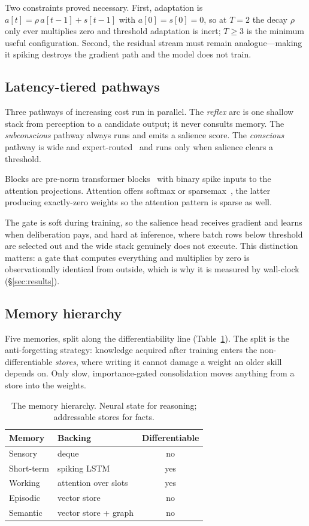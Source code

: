 \documentclass[10pt,twocolumn]{article}
\begin{document}
Two constraints proved necessary. First, adaptation is
$a[t] = \rho\,a[t{-}1] + s[t{-}1]$ with $a[0]=s[0]=0$, so at $T=2$ the decay
$\rho$ only ever multiplies zero and threshold adaptation is inert; $T\geq3$ is
the minimum useful configuration. Second, the residual stream must remain
analogue---making it spiking destroys the gradient path and the model does not
train.

\subsection{Latency-tiered pathways}

Three pathways of increasing cost run in parallel. The \emph{reflex} arc is one
shallow stack from perception to a candidate output; it never consults memory.
The \emph{subconscious} pathway always runs and emits a salience score. The
\emph{conscious} pathway is wide and expert-routed~\cite{shazeer2017,fedus2022}
and runs only when salience clears a threshold.

Blocks are pre-norm transformer blocks~\cite{vaswani2017} with binary spike
inputs to the attention projections. Attention offers softmax or
sparsemax~\cite{martins2016}, the latter producing exactly-zero weights so the
attention pattern is sparse as well.

The gate is soft during training, so the salience head receives gradient and
learns when deliberation pays, and hard at inference, where batch rows below
threshold are selected out and the wide stack genuinely does not execute. This
distinction matters: a gate that computes everything and multiplies by zero is
observationally identical from outside, which is why it is measured by
wall-clock (\S\ref{sec:results}).

\subsection{Memory hierarchy}

Five memories, split along the differentiability line
(Table~\ref{tab:memory}). The split is the anti-forgetting strategy: knowledge
acquired after training enters the non-differentiable \emph{stores}, where
writing it cannot damage a weight an older skill depends on. Only slow,
importance-gated consolidation moves anything from a store into the weights.

\begin{table}[t]
\centering\small
\begin{tabular}{@{}llc@{}}
\toprule
Memory & Backing & Differentiable \\
\midrule
Sensory & deque & no \\
Short-term & spiking LSTM & yes \\
Working & attention over slots & yes \\
Episodic & vector store & no \\
Semantic & vector store + graph & no \\
\bottomrule
\end{tabular}
\caption{The memory hierarchy. Neural state for reasoning; addressable stores
for facts.}
\label{tab:memory}
\end{table}
\end{document}
